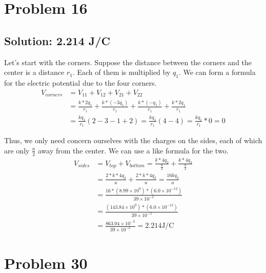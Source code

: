 \documentclass[12pt]{article}
\begin{document}
\section{Problem 16}
\subsection*{Solution: 2.214 \unit{\joule/\coulomb}}
Let's start with the corners.
Suppose the distance between the corners and the center is a distance $r_1$. Each of them is multiplied by $q_1$.
We can form a formula for the electric potential due to the four corners.
\begin{align*}
    V_{corners} &=  V_{11} + V_{12} + V_{21} + V_{22}\\
        &=  \frac{k*2q_1}{r_1} + \frac{k*(-3q_1)}{r_1} + \frac{k*(-q_1)}{r_1} + \frac{k*2q_1}{r_1}\\
        &=  \frac{kq_1}{r_1}(2 - 3 - 1 + 2)
        =   \frac{kq_1}{r_1}(4 - 4)
        =   \frac{kq_1}{r_1} * 0
        =   0
\end{align*}

Thus, we only need concern ourselves with the charges on the sides, each of which are only $\frac{a}{2}$ away from the center.
We can use a like formula for the two.
\begin{align*}
    V_{sides}   &=  V_{top} + V_{bottom}
        =   \frac{k*4q_2}{\frac{a}{2}} + \frac{k*4q_2}{\frac{a}{2}}\\
        &=  \frac{2*k*4q_2}{a} + \frac{2*k*4q_2}{a}
        =   \frac{16kq_2}{a}\\
        &=  \frac{16 * (8.99 \times 10^9) * (6.0 \times 10^{-12})}{39 \times 10^{-2}}\\
        &=  \frac{(143.84 \times 10^9) * (6.0 \times 10^{-12})}{39 \times 10^{-2}}\\
        &=  \frac{863.04 \times 10^{-3}}{39 \times 10^{-2}}
        =   \boxed{2.214 \unit{\joule/\coulomb}}
\end{align*}

\section{Problem 30}
\end{document}
